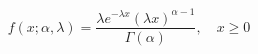 \documentclass[preview]{standalone}
\begin{document}
\begin{align*}
f(x; \alpha , \lambda )=\dfrac{ \lambda  e^{- \lambda  x}( \lambda  x)^{ \alpha -1}}{\Gamma( \alpha )},\quad x\ge0
\end{align*}
\end{document}
